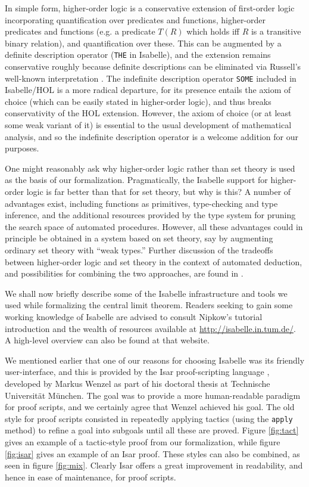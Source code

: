 \documentclass[leqno]{article}
\theoremstyle{definition}
\begin{document}
In simple form, higher-order logic is a conservative extension of first-order logic incorporating quantification over predicates and functions, higher-order predicates and functions (e.g. a predicate $T(R)$ which holds iff $R$ is a transitive binary relation), and quantification over these. This can be augmented by a definite description operator (\texttt{THE} in Isabelle), and the extension remains conservative roughly because definite descriptions can be eliminated via Russell's well-known interpretation \cite{russell-knowledge-acquaintance-description}. The indefinite description operator \texttt{SOME} included in Isabelle/HOL is a more radical departure, for its presence entails the axiom of choice (which can be easily stated in higher-order logic), and thus breaks conservativity of the HOL extension. However, the axiom of choice (or at least some weak variant of it) is essential to the usual development of mathematical analysis, and so the indefinite description operator is a welcome addition for our purposes.

One might reasonably ask why higher-order logic rather than set theory is used as the basis of our formalization. Pragmatically, the Isabelle support for higher-order logic is far better than that for set theory, but why is this? A number of advantages exist, including functions as primitives, type-checking and type inference, and the additional resources provided by the type system for pruning the search space of automated procedures. However, all these advantages could in principle be obtained in a system based on set theory, say by augmenting ordinary set theory with ``weak types.'' Further discussion of the tradeoffs between higher-order logic and set theory in the context of automated deduction, and possibilities for combining the two approaches, are found in \cite{gordon-hol-set}.

We shall now briefly describe some of the Isabelle infrastructure and tools we used while formalizing the central limit theorem. Readers seeking to gain some working knowledge of Isabelle are advised to consult Nipkow's tutorial introduction \cite{nipkow-prog-prove} and the wealth of resources available at \linebreak \url{http://isabelle.in.tum.de/}. A high-level overview can also be found at that website.

We mentioned earlier that one of our reasons for choosing Isabelle was its friendly user-interface, and this is provided by the Isar proof-scripting language \cite{wenzel-isar}, developed by Markus Wenzel as part of his doctoral thesis at Technische Universit\"at M\"unchen. The goal was to provide a more human-readable paradigm for proof scripts, and we certainly agree that Wenzel achieved his goal. The old style for proof scripts consisted in repeatedly applying tactics (using the \texttt{apply} method) to refine a goal into subgoals until all these are proved. Figure \ref{fig:tact} gives an example of a tactic-style proof from our formalization, while figure \ref{fig:isar} gives an example of an Isar proof. These styles can also be combined, as seen in figure \ref{fig:mix}. Clearly Isar offers a great improvement in readability, and hence in ease of maintenance, for proof scripts.
\end{document}
